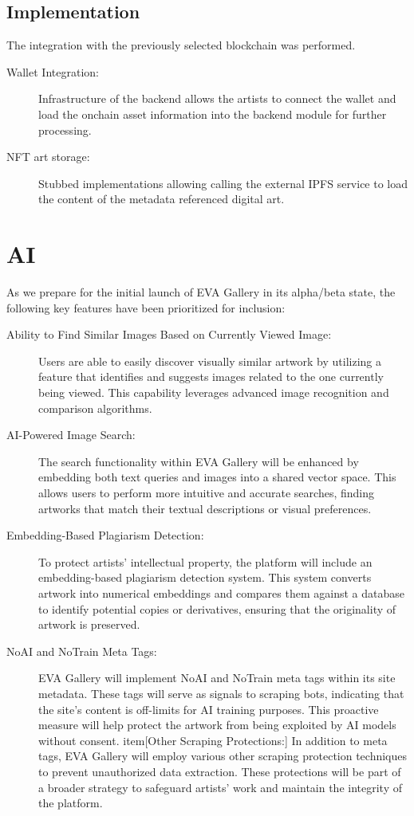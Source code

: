 \subsection{Implementation}
The integration with the previously selected blockchain was performed.

\begin{description}
    \item[Wallet Integration:] Infrastructure of the backend allows the artists to connect the wallet and load the onchain asset information into the backend module for further processing.
    \item[NFT art storage:] Stubbed implementations allowing calling the external IPFS service to load the content of the metadata referenced digital art.
\end{description}

\section{AI}

As we prepare for the initial launch of EVA Gallery in its alpha/beta state, the following key features have been prioritized for inclusion:

\begin{description}
    \item[Ability to Find Similar Images Based on Currently Viewed Image:] Users are able to easily discover visually similar artwork by utilizing a feature that identifies and suggests images related to the one currently being viewed. This capability leverages advanced image recognition and comparison algorithms.
    \item[AI-Powered Image Search:] The search functionality within EVA Gallery will be enhanced by embedding both text queries and images into a shared vector space. This allows users to perform more intuitive and accurate searches, finding artworks that match their textual descriptions or visual preferences.
    \item[Embedding-Based Plagiarism Detection:] To protect artists’ intellectual property, the platform will include an embedding-based plagiarism detection system. This system converts artwork into numerical embeddings and compares them against a database to identify potential copies or derivatives, ensuring that the originality of artwork is preserved.
    \item[NoAI and NoTrain Meta Tags:] EVA Gallery will implement NoAI and NoTrain meta tags within its site metadata. These tags will serve as signals to scraping bots, indicating that the site’s content is off-limits for AI training purposes. This proactive measure will help protect the artwork from being exploited by AI models without consent.
    item[Other Scraping Protections:] In addition to meta tags, EVA Gallery will employ various other scraping protection techniques to prevent unauthorized data extraction. These protections will be part of a broader strategy to safeguard artists' work and maintain the integrity of the platform.
\end{description}

